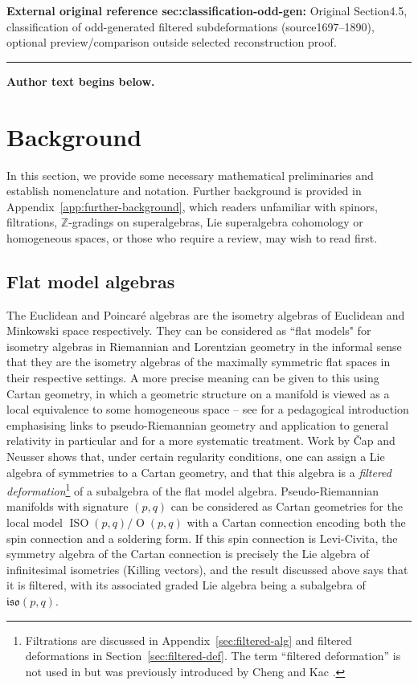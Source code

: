 \documentclass[11pt]{article}
\numberwithin{equation}{section}
\numberwithin{equation}{section}
\newcommand{\fiso}{\mathfrak{iso}}
\newcommand{\ZZ}{\mathbb{Z}}
\newcommand{\1}{\mathbbm{1}}
\DeclareMathOperator{\Orth}{O}
\DeclareMathOperator{\ISO}{ISO}
\begin{document}
\noindent\textbf{External original reference sec:classification-odd-gen:} Original Section4.5, classification of odd-generated filtered subdeformations (source1697–1890), optional preview/comparison outside selected reconstruction proof.\par
\medskip\hrule\medskip\noindent\textbf{Author text begins below.}\par
\setcounter{section}{1}
\section{Background}
\label{sec:background}

In this section, we provide some necessary mathematical preliminaries and establish nomenclature and notation. Further background is provided in Appendix~\ref{app:further-background}, which readers unfamiliar with spinors, filtrations, $\ZZ$-gradings on superalgebras, Lie superalgebra cohomology or homogeneous spaces, or those who require a review, may wish to read first.

\subsection{Flat model algebras}
\label{sec:flat-model-algs}

The Euclidean and Poincar\'e algebras are the isometry algebras of Euclidean and Minkowski space respectively. They can be considered as ``flat models" for isometry algebras in Riemannian and Lorentzian geometry in the informal sense that they are the isometry algebras of the maximally symmetric flat spaces in their respective settings. A more precise meaning can be given to this using Cartan geometry, in which a geometric structure on a manifold is viewed as a local equivalence to some homogeneous space -- see \cite{Wise2010} for a pedagogical introduction emphasising links to pseudo-Riemannian geometry and application to general relativity in particular and \cite{Cap2009_1} for a more systematic treatment. Work by \v{C}ap and Neusser \cite{Cap2009} shows that, under certain regularity conditions, one can assign a Lie algebra of symmetries to a Cartan geometry, and that this algebra is a \emph{filtered deformation}\footnote{Filtrations are discussed in Appendix~\ref{sec:filtered-alg} and filtered deformations in Section~\ref{sec:filtered-def}. The term ``filtered deformation'' is not used in \cite{Cap2009} but was previously introduced by Cheng and Kac \cite{Cheng1998}.}
of a subalgebra of the flat model algebra. Pseudo-Riemannian manifolds with signature $(p,q)$ can be considered as Cartan geometries for the local model $\ISO(p,q)/\Orth(p,q)$ with a Cartan connection encoding both the spin connection and a soldering form. If this spin connection is Levi-Civita, the symmetry algebra of the Cartan connection is precisely the Lie algebra of infinitesimal isometries (Killing vectors), and the result discussed above says that it is filtered, with its associated graded Lie algebra being a subalgebra of $\fiso(p,q)$.
\end{document}
